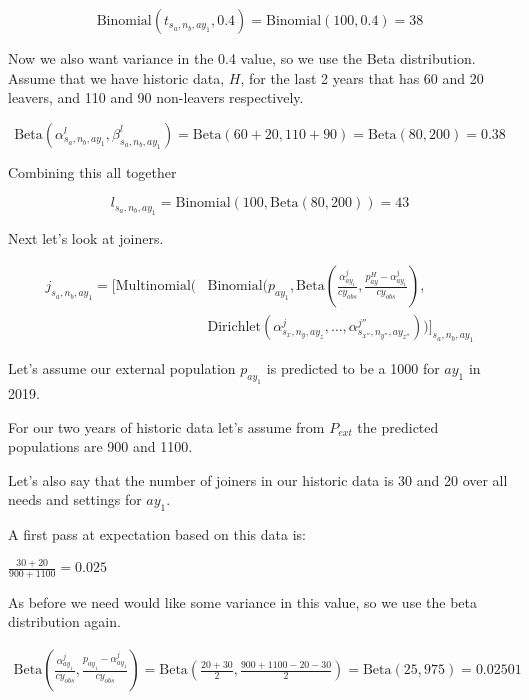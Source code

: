 \documentclass[margin=5mm]{article}
\begin{document}
\begin{equation*}
  \text{Binomial}(t_{s_a,n_b,ay_1}, 0.4) = \text{Binomial}(100, 0.4) = 38
\end{equation*}

Now we also want variance in the 0.4 value, so we use the Beta
distribution.  Assume that we have historic data, $H$, for the last 2
years that has 60 and 20 leavers, and 110 and 90 non-leavers
respectively.

\begin{equation*}
\text{Beta}(\alpha^l_{s_a,n_b,ay_1}, \beta^l_{s_a,n_b,ay_1}) =
\text{Beta}(60+20,110+90) = \text{Beta}(80,200) = 0.38
\end{equation*}

Combining this all together

\begin{equation*}
l_{s_a,n_b,ay_1} =
  \text{Binomial}(100,\text{Beta}(80,200)) = 43
\end{equation*}

Next let's look at joiners.

\begin{equation*}
  \begin{split}
j_{s_a,n_b,ay_1} = \bigg[\text{Multinomial}( & \text{Binomial}(p_{ay_1},
\text{Beta}(\frac{\alpha^j_{ay_1}}{cy_{obs}},\frac{p^{H}_{ay} -\alpha^j_{ay_1}}{cy_{obs}}), \\
& \text{Dirichlet}(\alpha^{j}_{s_x,n_y,ay_z}, \dots
, \alpha^{j''}_{s_{x''},n_{y''},ay_{z''}}))\bigg]_{s_a,n_b,ay_1}
  \end{split}
\end{equation*}

Let's assume our external population $p_{ay_1}$ is predicted to be a
1000 for $ay_1$ in 2019.

For our two years of historic data let's assume from $P_{ext}$ the
predicted populations are 900 and 1100.

Let's also say that the number of joiners in our historic data is 30
and 20 over all needs and settings for $ay_1$.

A first pass at expectation based on this data is:

$\frac{30+20}{900 + 1100} = 0.025$

As before we need would like some variance in this value, so we use
the beta distribution again.

\begin{equation*}
  \begin{split}
\text{Beta}(\frac{\alpha^j_{ay_1}}{cy_{obs}},\frac{p_{ay_1}
  -\alpha^j_{ay_1}}{cy_{obs}}) = \text{Beta}(\frac{20+30}{2},\frac{900
  + 1100 - 20 - 30}{2}) = \text{Beta}(25,975) = 0.02501
  \end{split}
\end{equation*}
\end{document}
